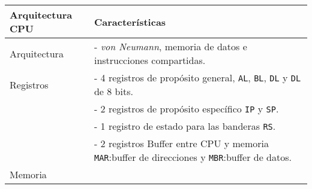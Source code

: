 \documentclass[12pt,twoside]{templates/unerthesis}
\begin{document}
\begin{longtable}[]{@{}ll@{}}
\toprule
\begin{minipage}[b]{0.47\columnwidth}\raggedright
Arquitectura CPU\strut
\end{minipage} & \begin{minipage}[b]{0.47\columnwidth}\raggedright
\textbf{Características}\strut
\end{minipage}\tabularnewline
\midrule
\endhead
\begin{minipage}[t]{0.47\columnwidth}\raggedright
Arquitectura\strut
\end{minipage} & \begin{minipage}[t]{0.47\columnwidth}\raggedright
- \emph{von Neumann}, memoria de datos e instrucciones compartidas.\strut
\end{minipage}\tabularnewline
\begin{minipage}[t]{0.47\columnwidth}\raggedright
Registros\strut
\end{minipage} & \begin{minipage}[t]{0.47\columnwidth}\raggedright
- 4 registros de propósito general, \texttt{AL}, \texttt{BL}, \texttt{DL} y \texttt{DL} de 8 bits.\strut
\end{minipage}\tabularnewline
\begin{minipage}[t]{0.47\columnwidth}\raggedright
\strut
\end{minipage} & \begin{minipage}[t]{0.47\columnwidth}\raggedright
- 2 registros de propósito específico \texttt{IP} y \texttt{SP}.\strut
\end{minipage}\tabularnewline
\begin{minipage}[t]{0.47\columnwidth}\raggedright
\strut
\end{minipage} & \begin{minipage}[t]{0.47\columnwidth}\raggedright
- 1 registro de estado para las banderas \texttt{RS}.\strut
\end{minipage}\tabularnewline
\begin{minipage}[t]{0.47\columnwidth}\raggedright
\strut
\end{minipage} & \begin{minipage}[t]{0.47\columnwidth}\raggedright
- 2 registros Buffer entre CPU y memoria \texttt{MAR}:buffer de direcciones y \texttt{MBR}:buffer de datos.\strut
\end{minipage}\tabularnewline
\begin{minipage}[t]{0.47\columnwidth}\raggedright
Memoria\strut
\end{minipage} & \begin{minipage}[t]{0.47\columnwidth}\raggedright

\end{minipage}
\end{longtable}
\end{document}

